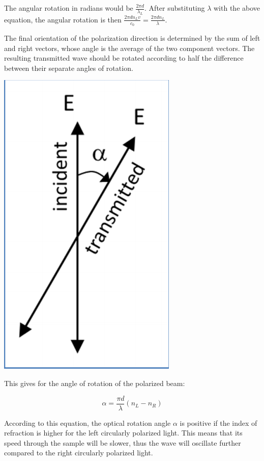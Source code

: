 \documentclass[12pt, letterpaper]{article}
\begin{document}
The angular rotation in radians would be $\frac{2 \pi d}{\lambda_L}$. After substituting $\lambda$ with the above equation, the angular rotation is then \( \frac{2 \pi d n_L v}{c_0} = \frac{2 \pi d n_L}{\lambda} \).

The final orientation of the polarization direction is determined by the sum of left and right vectors, whose angle is the average of the two component vectors. The resulting transmitted wave should be rotated according to half the difference between their
separate angles of rotation. 

\begin{center}
    \includegraphics[scale = 0.5]{angle of rotation.png}
\end{center}

This gives for the angle of rotation of the polarized beam: 

\begin{equation*}
    \alpha = \frac{\pi d}{\lambda} (n_L - n_R)
\end{equation*}

According to this equation, the optical rotation angle $\alpha$ is positive if the index of refraction is higher for the left circularly polarized light. 
This means that its speed through the sample will be slower, thus the wave will oscillate further compared to the right circularly polarized light. 
\end{document}
